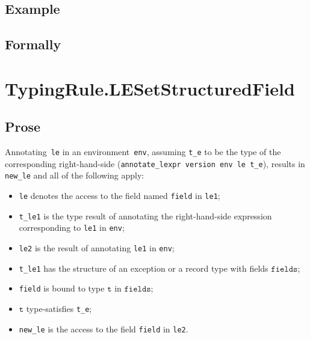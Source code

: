 \documentclass{book}
\newcommand\vt[0]{\texttt{t}}
\newcommand\fields[0]{\texttt{fields}}
\begin{document}
\begin{itemize}
  \subsection{Example}



\begin{emptyformal}
    \subsection{Formally}
\end{emptyformal}


\section{TypingRule.LESetStructuredField \label{sec:TypingRule.LESetStructuredField}}

    \subsection{Prose}
   Annotating~\texttt{le} in an environment~\texttt{env}, assuming
\texttt{t\_e} to be the type of the corresponding right-hand-side
(\texttt{annotate\_lexpr version env le t\_e}), results in \texttt{new\_le} and
all of the following apply:
   \begin{itemize}
   \item \texttt{le} denotes the access to the field named \texttt{field} in \texttt{le1};
   \item \texttt{t\_le1} is the type result of annotating the right-hand-side expression corresponding to \texttt{le1} in \texttt{env};
   \item \texttt{le2} is the result of annotating \texttt{le1} in \texttt{env};
   \item \texttt{t\_le1} has the structure of an exception or a record type with fields $\fields$;
   \item \texttt{field} is bound to type $\vt$ in $\fields$;
   \item $\vt$ type-satisfies \texttt{t\_e};
   \item \texttt{new\_le} is the access to the field \texttt{field} in \texttt{le2}.
   \end{itemize}


\end{itemize}
\end{document}

